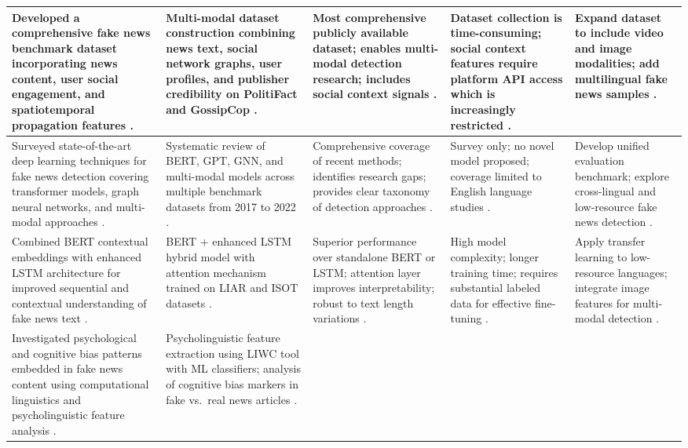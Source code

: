 \documentclass[runningheads]{llncs}
\begin{document}
\begin{longtable}{|p{}|p{}|p{}|p{}|p{}|}
Developed a comprehensive fake news benchmark dataset incorporating news content, user social engagement, and spatiotemporal propagation features \cite{Shu2020FakeNewsNet}. &
Multi-modal dataset construction combining news text, social network graphs, user profiles, and publisher credibility on PolitiFact and GossipCop \cite{Shu2020FakeNewsNet}. &
Most comprehensive publicly available dataset; enables multi-modal detection research; includes social context signals \cite{Shu2020FakeNewsNet}. &
Dataset collection is time-consuming; social context features require platform API access which is increasingly restricted \cite{Shu2020FakeNewsNet}. &
Expand dataset to include video and image modalities; add multilingual fake news samples \cite{Shu2020FakeNewsNet}. \\ \hline
Surveyed state-of-the-art deep learning techniques for fake news detection covering transformer models, graph neural networks, and multi-modal approaches \cite{Mehta2022RecentTrends}. &
Systematic review of BERT, GPT, GNN, and multi-modal models across multiple benchmark datasets from 2017 to 2022 \cite{Mehta2022RecentTrends}. &
Comprehensive coverage of recent methods; identifies research gaps; provides clear taxonomy of detection approaches \cite{Mehta2022RecentTrends}. &
Survey only; no novel model proposed; coverage limited to English language studies \cite{Mehta2022RecentTrends}. &
Develop unified evaluation benchmark; explore cross-lingual and low-resource fake news detection \cite{Mehta2022RecentTrends}. \\ \hline
Combined BERT contextual embeddings with enhanced LSTM architecture for improved sequential and contextual understanding of fake news text \cite{Rai2022FakeNews}. &
BERT + enhanced LSTM hybrid model with attention mechanism trained on LIAR and ISOT datasets \cite{Rai2022FakeNews}. &
Superior performance over standalone BERT or LSTM; attention layer improves interpretability; robust to text length variations \cite{Rai2022FakeNews}. &
High model complexity; longer training time; requires substantial labeled data for effective fine-tuning \cite{Rai2022FakeNews}. &
Apply transfer learning to low-resource languages; integrate image features for multi-modal detection \cite{Rai2022FakeNews}. \\ \hline
Investigated psychological and cognitive bias patterns embedded in fake news content using computational linguistics and psycholinguistic feature analysis \cite{CarrascoFarre2022Fingerprints}. &
Psycholinguistic feature extraction using LIWC tool with ML classifiers; analysis of cognitive bias markers in fake vs.\ real news articles \cite{CarrascoFarre2022Fingerprints}. &

\end{longtable}
\end{document}
